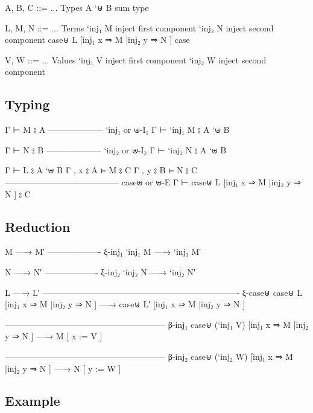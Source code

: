 \begin{myDisplay}
A, B, C ::= ...                     Types
  A `⊎ B                              sum type

L, M, N ::= ...                     Terms
  `inj₁ M                             inject first component
  `inj₂ N                             inject second component
  case⊎ L [inj₁ x ⇒ M |inj₂ y ⇒ N ]    case

V, W ::= ...                        Values
  `inj₁ V                             inject first component
  `inj₂ W                             inject second component
\end{myDisplay}

\hypertarget{typing-4}{%
\subsection{Typing}\label{typing-4}}

\begin{myDisplay}
Γ ⊢ M ⦂ A
-------------------- `inj₁ or ⊎-I₁
Γ ⊢ `inj₁ M ⦂ A `⊎ B

Γ ⊢ N ⦂ B
-------------------- `inj₂ or ⊎-I₂
Γ ⊢ `inj₂ N ⦂ A `⊎ B

Γ ⊢ L ⦂ A `⊎ B
Γ , x ⦂ A ⊢ M ⦂ C
Γ , y ⦂ B ⊢ N ⦂ C
----------------------------------------- case⊎ or ⊎-E
Γ ⊢ case⊎ L [inj₁ x ⇒ M |inj₂ y ⇒ N ] ⦂ C
\end{myDisplay}

\hypertarget{reduction-4}{%
\subsection{Reduction}\label{reduction-4}}

\begin{myDisplay}
M —→ M′
------------------- ξ-inj₁
`inj₁ M —→ `inj₁ M′

N —→ N′
------------------- ξ-inj₂
`inj₂ N —→ `inj₂ N′

L —→ L′
---------------------------------------------------------------------- ξ-case⊎
case⊎ L [inj₁ x ⇒ M |inj₂ y ⇒ N ] —→ case⊎ L′ [inj₁ x ⇒ M |inj₂ y ⇒ N ]

--------------------------------------------------------- β-inj₁
case⊎ (`inj₁ V) [inj₁ x ⇒ M |inj₂ y ⇒ N ] —→ M [ x := V ]

--------------------------------------------------------- β-inj₂
case⊎ (`inj₂ W) [inj₁ x ⇒ M |inj₂ y ⇒ N ] —→ N [ y := W ]
\end{myDisplay}

\hypertarget{example-4}{%
\subsection{Example}\label{example-4}}

